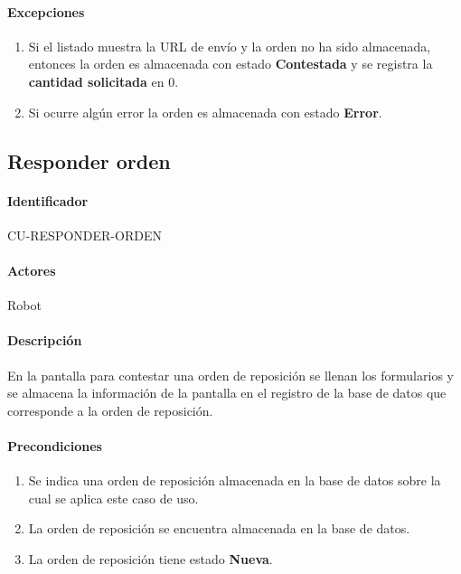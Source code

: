 \paragraph*{Excepciones}
\begin{enumerate}
  \item Si el listado muestra la URL de envío y la orden no ha sido almacenada, entonces la orden es almacenada con estado \textbf{Contestada} y se registra la \textbf{cantidad solicitada} en 0.
  \item Si ocurre algún error la orden es almacenada con estado \textbf{Error}.
\end{enumerate}


\subsection{Responder orden}
\paragraph*{Identificador}
CU-RESPONDER-ORDEN
\paragraph*{Actores}
Robot
\paragraph*{Descripción}
En la pantalla para contestar una orden de reposición se llenan los formularios y se almacena la información de la pantalla en el registro de la base de datos que corresponde a la orden de reposición.
\paragraph*{Precondiciones}
\begin{enumerate}
  \item Se indica una orden de reposición almacenada en la base de datos sobre la cual se aplica este caso de uso.
  \item La orden de reposición se encuentra almacenada en la base de datos.
  \item La orden de reposición tiene estado \textbf{Nueva}.
\end{enumerate}
